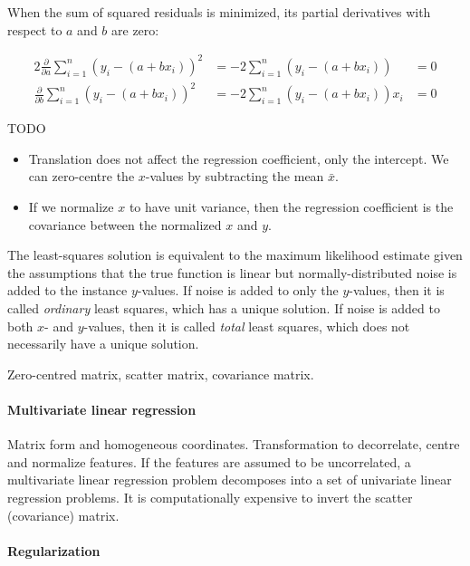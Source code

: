 When the sum of squared residuals is minimized, its partial derivatives with
respect to $a$ and $b$ are zero:

\begin{alignat}{2}
      \frac{\partial}{\partial a} \sum_{i = 1}^{n} (y_i - (a + b x_i))^2
       & = - 2 \sum_{i = 1}^{n} (y_i - (a + b x_i))
       & = 0
      \\
      \frac{\partial}{\partial b} \sum_{i = 1}^{n} (y_i - (a + b x_i))^2
       & = - 2 \sum_{i = 1}^{n} (y_i - (a + b x_i)) x_i
       & = 0
\end{alignat}

TODO

\begin{itemize}
      \item Translation does not affect the regression coefficient, only the intercept.
            We can zero-centre the $x$-values by subtracting the mean $\bar{x}$.
      \item If we normalize $x$ to have unit variance, then the regression
            coefficient is the covariance between the normalized $x$ and $y$.
\end{itemize}

The least-squares solution is equivalent to the maximum likelihood estimate
given the assumptions that the true function is linear but normally-distributed
noise is added to the instance $y$-values.
If noise is added to only the $y$-values, then it is called \textit{ordinary}
least squares, which has a unique solution.
If noise is added to both $x$- and $y$-values, then it is called \textit{total}
least squares, which does not necessarily have a unique solution.

Zero-centred matrix, scatter matrix, covariance matrix.

\paragraph{Multivariate linear regression}

Matrix form and homogeneous coordinates.
Transformation to decorrelate, centre and normalize features.
If the features are assumed to be uncorrelated, a multivariate linear regression
problem decomposes into a set of univariate linear regression problems.
It is computationally expensive to invert the scatter (covariance) matrix.

\paragraph{Regularization}

